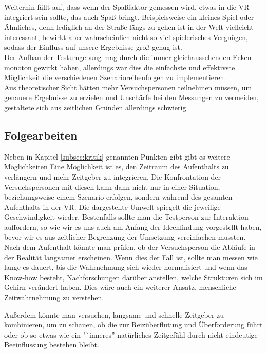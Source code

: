 \documentclass{Bericht}
\begin{document}
Weiterhin fällt auf, dass wenn der Spaßfaktor gemessen wird, etwas in die VR integriert sein sollte, das auch Spaß bringt. Beispielsweise ein kleines Spiel oder Ähnliches, denn lediglich an der Straße längs zu gehen ist in der Welt vielleicht interessant, bewirkt aber wahrscheinlich nicht so viel spielerisches Vergnügen, sodass der Einfluss auf unsere Ergebnisse groß  genug ist. \\
Der Aufbau der Testumgebung mag durch die immer gleichaussehenden Ecken monoton gewirkt haben, allerdings war dies die einfachste und effektivste Möglichkeit die verschiedenen Szenarioreihenfolgen zu implementieren.\\
Aus theoretischer Sicht hätten mehr Versuchspersonen teilnehmen müssen, um genauere Ergebnisse zu erzielen und Unschärfe bei den Messungen zu vermeiden, gestaltete sich aus zeitlichen Gründen allerdings schwierig. 

\subsection{Folgearbeiten}
Neben in Kapitel \ref{subsec:kritik} genannten Punkten gibt gibt es weitere Möglichkeiten 
Eine Möglichkeit ist es, den Zeitraum des Aufenthalts zu verlängern und mehr Zeitgeber zu integrieren. Die Konfrontation der Versuchspersonen mit diesen kann dann nicht nur in einer Situation, beziehungsweise einem Szenario erfolgen, sondern während des gesamten Aufenthalts in der VR. Die dargestellte Umwelt spiegelt die jeweilige Geschwindigkeit wieder. Bestenfalls sollte man die Testperson zur Interaktion auffordern, so wie wir es uns auch am Anfang der Ideenfindung vorgestellt haben, bevor wir es aus zeitlicher Begrenzung der Umsetzung vereinfachen mussten. Nach dem Aufenthalt könnte man prüfen, ob der Versuchsperson die Abläufe in der Realität langsamer erscheinen. Wenn dies der Fall ist, sollte man messen wie lange es dauert, bis die Wahrnehmung sich wieder normalisiert und wenn das Know-how besteht, Nachforschungen darüber anstellen, welche Strukturen sich im Gehirn verändert haben. Dies wäre auch ein weiterer Ansatz, menschliche Zeitwahrnehmung zu verstehen.

Außerdem könnte man versuchen, langsame und schnelle Zeitgeber zu  kombinieren, um zu schauen, ob die zur Reizüberflutung und Überforderung führt oder ob so etwas wie ein "`inneres'' natürliches Zeitgefühl durch nicht eindeutige Beeinflussung bestehen bleibt.
\end{document}
